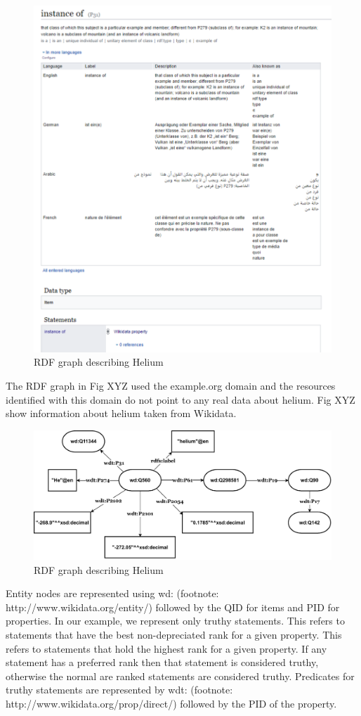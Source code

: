 \begin{figure}[h]
  \centering
  \includegraphics[width=0.75 \linewidth]{images/instance_of.pdf}
  \caption{RDF graph describing Helium}
  \label{fig:figure 3}
\end{figure}


The RDF graph in Fig XYZ used the example.org domain and the resources identified with this domain do not point to any real data about helium. Fig XYZ show information about helium taken from Wikidata. 


\begin{figure}[h]
  \centering
  \includegraphics[width=0.75 \linewidth]{images/wikidata_graph.drawio.pdf}
  \caption{RDF graph describing Helium}
  \label{fig:figure 3}
\end{figure}

Entity nodes are represented using wd: (footnote: http://www.wikidata.org/entity/) followed by the QID for items and PID for properties. In our example, we represent only truthy statements. This refers to statements that have the best non-depreciated rank for a given property. This refers to statements that hold the highest rank for a given property. If any statement has a preferred rank then that statement is considered truthy, otherwise the normal are ranked statements are considered truthy. Predicates for truthy statements are represented by wdt: (footnote: http://www.wikidata.org/prop/direct/) followed by the PID of the property. 


